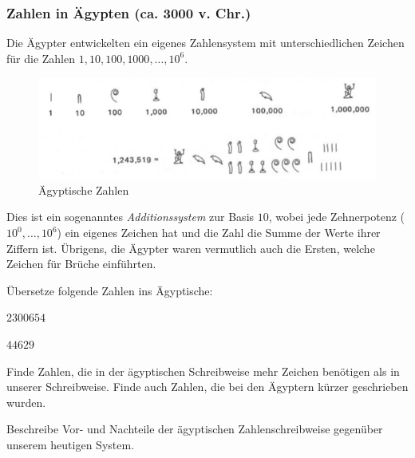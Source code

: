 \documentclass[%
11pt,%
twoside,%
titlepage,%
german,%
]{scrartcl}
\begin{document}
\subsubsection{Zahlen in \"Agypten (ca. 3000 v. Chr.)}
Die \"Agypter entwickelten ein eigenes Zahlensystem mit unterschiedlichen Zeichen f\"ur die Zahlen $1, 10, 100, 1000, \dots, 10^6$.
\begin{figure}[h!]
\begin{center}
\includegraphics[width=1\textwidth]{pictures/aegyptischeZahlen}
\end{center}
\caption{\"Agyptische Zahlen}
\end{figure}
Dies ist ein sogenanntes \emph{Additionssystem} zur Basis $10$, wobei jede Zehnerpotenz ($10^0, \dots, 10^6$) ein eigenes Zeichen hat und die Zahl die Summe der Werte ihrer Ziffern ist. \"Ubrigens, die \"Agypter waren vermutlich auch die Ersten, welche Zeichen f\"ur Br\"uche einf\"uhrten.

\begin{ueb}[ägyptisch]
\"Ubersetze folgende Zahlen ins \glqq \"Agyptische\grqq:\\

\begin{minipage}{0.4\textwidth}
\begin{enumeratea}
\item $2300654$
\end{enumeratea}
\end{minipage}
\begin{minipage}{0.23\textwidth}
\begin{enumeratea}
\addtocounter{enumi}{1}
\item $44629$
\end{enumeratea}
\end{minipage}
\end{ueb}
\begin{ueb}
Finde Zahlen, die in der \"agyptischen Schreibweise mehr Zeichen ben\"otigen als in unserer Schreibweise. Finde auch Zahlen, die bei den \"Agyptern k\"urzer geschrieben wurden.
\end{ueb}
\begin{ueb}[vorteil?]
Beschreibe Vor- und Nachteile der \"agyptischen Zahlenschreibweise ge\-gen\-\"uber unserem heutigen System.
\end{ueb}
\end{document}
